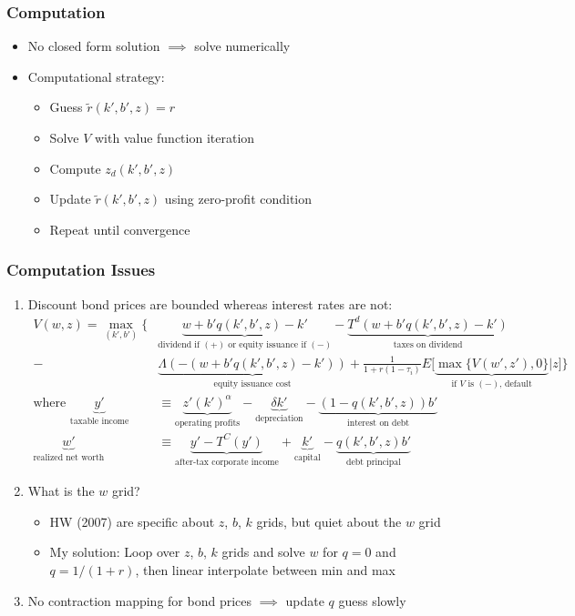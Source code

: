 \documentclass[usenames,dvipsnames, handout]{beamer}
\begin{document}
\begin{frame}
\frametitle{Computation}
\small
\begin{itemize}
\item No closed form solution $\implies$ solve numerically
\bigskip
\item Computational strategy:
\begin{itemize}
\item Guess $\tilde r (k', b', z) = r$
\item Solve $V$ with value function iteration
\item Compute $z_d(k', b', z)$
\item Update $\tilde r(k', b', z)$ using zero-profit condition
\item Repeat until convergence
\end{itemize}
\end{itemize}
\end{frame}



\begin{frame}
\frametitle{Computation Issues}
\small
\begin{enumerate}
\item Discount bond prices are bounded whereas interest rates are not:
\scriptsize
\begin{align*}
V(w, z) =
\max_{(k', b')} \Bigg\{ 
& \underbrace{w + b'q(k',b',z) - k'}_{\text{dividend if } (+) \text{ or equity issuance if } (-)} - \underbrace{T^d(w + b'q(k',b',z) - k')}_{\text{taxes on dividend}} \\
- &\underbrace{\Lambda(-(w + b'q(k',b',z) - k'))}_{\text{equity issuance cost}} + \frac{1}{1+r(1-\tau_i)} E\Big[\underbrace{\max\{ V(w', z'), 0\}}_{\text{if }V \text{ is } (-) \text{, default}}| z\Big] \Bigg\} \\
\text{where }
\underbrace{y'}_{\text{taxable income}} &\equiv \underbrace{z' (k')^\alpha}_{\text{operating profits}} - \underbrace{\delta k'}_{\text{depreciation}} - \underbrace{(1-q(k',b',z)) b'}_{\text{interest on debt}} \\
\underbrace{w'}_{\text{realized net worth}} &\equiv \underbrace{y' - T^C(y')}_{\text{after-tax corporate income}}+ \underbrace{k'}_{\text{capital}}  - \underbrace{q(k',b',z)b'}_{\text{debt principal}}
\end{align*}
\small
\item What is the $w$ grid?
\begin{itemize}
\item HW (2007) are specific about $z$, $b$, $k$ grids, but quiet about the $w$ grid
\item My solution: Loop over $z$, $b$, $k$ grids and solve $w$ for $q = 0$ and $q = 1/(1+r)$, then linear interpolate between min and max
\end{itemize}
\item No contraction mapping for bond prices $\implies$ update $q$ guess slowly
\end{enumerate}
\end{frame}
\end{document}
